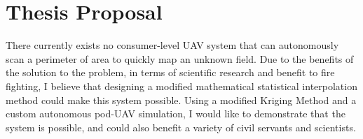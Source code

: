 \documentclass[preprint,12pt]{elsarticle}
\begin{document}

\section{Thesis Proposal} 
\noindent
There currently exists no consumer-level UAV system that can autonomously scan a perimeter of area to quickly map an unknown field. Due to the benefits of the solution to the problem, in terms of scientific research and benefit to fire fighting, I believe that designing a modified mathematical statistical interpolation method could make this system possible. Using a modified Kriging Method and a custom autonomous pod-UAV simulation, I would like to demonstrate that the system is possible, and could also benefit a variety of civil servants and scientists.
\end{document}
